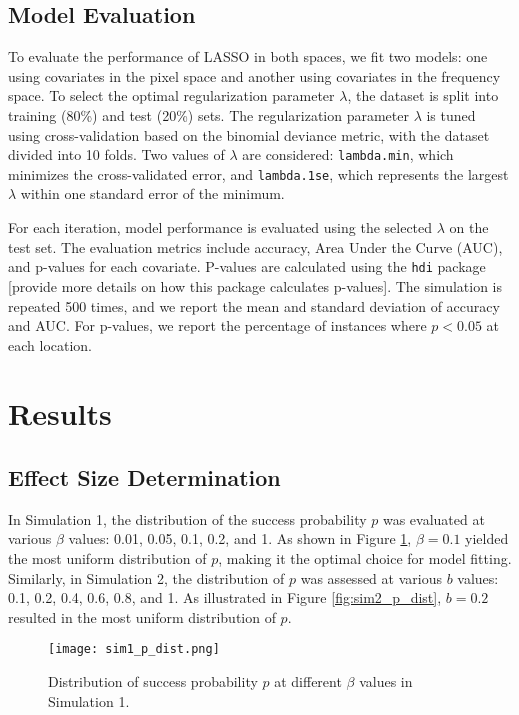 \documentclass[12pt]{article}
\begin{document}
\subsection*{Model Evaluation}

To evaluate the performance of LASSO in both spaces, we fit two models: one using covariates in the pixel space and another using covariates in the frequency space. To select the optimal regularization parameter \( \lambda \), the dataset is split into training (80\%) and test (20\%) sets. The regularization parameter \( \lambda \) is tuned using cross-validation based on the binomial deviance metric, with the dataset divided into 10 folds. Two values of \( \lambda \) are considered: \texttt{lambda.min}, which minimizes the cross-validated error, and \texttt{lambda.1se}, which represents the largest \( \lambda \) within one standard error of the minimum.

For each iteration, model performance is evaluated using the selected \( \lambda \) on the test set. The evaluation metrics include accuracy, Area Under the Curve (AUC), and p-values for each covariate. P-values are calculated using the \texttt{hdi} package [provide more details on how this package calculates p-values]. The simulation is repeated 500 times, and we report the mean and standard deviation of accuracy and AUC. For p-values, we report the percentage of instances where \( p < 0.05 \) at each location.


\section*{Results}

\subsection*{Effect Size Determination}

In Simulation 1, the distribution of the success probability \( p \) was evaluated at various \( \beta \) values: 0.01,
0.05, 0.1, 0.2, and 1. As shown in Figure \ref{fig:sim1_p_dist}, \( \beta = 0.1 \) yielded the most uniform distribution
of \( p \), making it the optimal choice for model fitting. Similarly, in Simulation 2, the distribution of \( p \) was assessed at various \( b \) values: 0.1, 0.2, 0.4, 0.6, 0.8, and 1. As illustrated in Figure \ref{fig:sim2_p_dist}, \( b = 0.2 \) resulted in the most uniform distribution of \( p \).

\begin{figure}[h!]
	\centering
	\texttt{[image: sim1\_p\_dist.png]}
	\caption{Distribution of success probability \( p \) at different \( \beta \) values in Simulation 1.}
	\label{fig:sim1_p_dist}
\end{figure}
\end{document}
